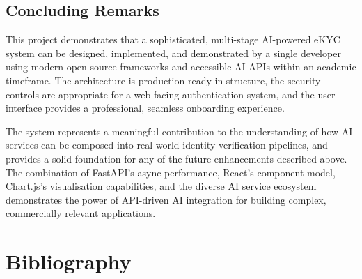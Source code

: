 \section{Concluding Remarks}

This project demonstrates that a sophisticated, multi-stage AI-powered eKYC system can be designed, implemented, and demonstrated by a single developer using modern open-source frameworks and accessible AI APIs within an academic timeframe. The architecture is production-ready in structure, the security controls are appropriate for a web-facing authentication system, and the user interface provides a professional, seamless onboarding experience.

The system represents a meaningful contribution to the understanding of how AI services can be composed into real-world identity verification pipelines, and provides a solid foundation for any of the future enhancements described above. The combination of FastAPI's async performance, React's component model, Chart.js's visualisation capabilities, and the diverse AI service ecosystem demonstrates the power of API-driven AI integration for building complex, commercially relevant applications.

\chapter*{Bibliography}

